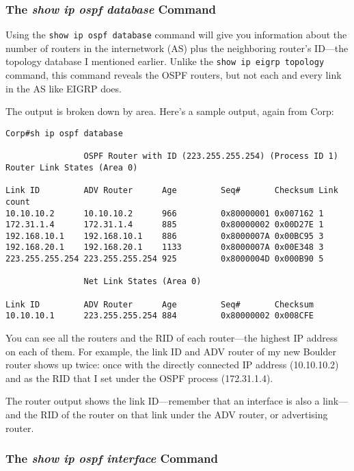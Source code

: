 \subsubsection[The \emph{show ip ospf database}
Command]{\texorpdfstring{\protect\hypertarget{c18.xhtmlux5cux23c18-sec-13}{}{}The
\emph{show ip ospf database}
Command}{The show ip ospf database Command}}

Using the \texttt{show\ ip\ ospf\ database} command will give you
information about the number of routers in the internetwork (AS) plus
the neighboring router's ID---the topology database I mentioned earlier.
Unlike the \texttt{show\ ip\ eigrp\ topology} command, this command
reveals the OSPF routers, but not each and every link in the AS like
EIGRP does.

The output is broken down by area. Here's a sample output, again from
Corp:

\begin{verbatim}
Corp#sh ip ospf database
 
                OSPF Router with ID (223.255.255.254) (Process ID 1)
Router Link States (Area 0)
 
Link ID         ADV Router      Age         Seq#       Checksum Link count
10.10.10.2      10.10.10.2      966         0x80000001 0x007162 1
172.31.1.4      172.31.1.4      885         0x80000002 0x00D27E 1
192.168.10.1    192.168.10.1    886         0x8000007A 0x00BC95 3
192.168.20.1    192.168.20.1    1133        0x8000007A 0x00E348 3
223.255.255.254 223.255.255.254 925         0x8000004D 0x000B90 5
 
                Net Link States (Area 0)
 
Link ID         ADV Router      Age         Seq#       Checksum
10.10.10.1      223.255.255.254 884         0x80000002 0x008CFE
\end{verbatim}

\protect\hypertarget{c18.xhtmlux5cux23Page_768}{}{}You can see all the
routers and the RID of each router---the highest IP address on each of
them. For example, the link ID and ADV router of my new Boulder router
shows up twice: once with the directly connected IP address (10.10.10.2)
and as the RID that I set under the OSPF process (172.31.1.4).

The router output shows the link ID---remember that an interface is also
a link---and the RID of the router on that link under the ADV router, or
advertising router.

\subsubsection[The \emph{show ip ospf interface}
Command]{\texorpdfstring{\protect\hypertarget{c18.xhtmlux5cux23c18-sec-14}{}{}The
\emph{show ip ospf interface}
Command}{The show ip ospf interface Command}}

